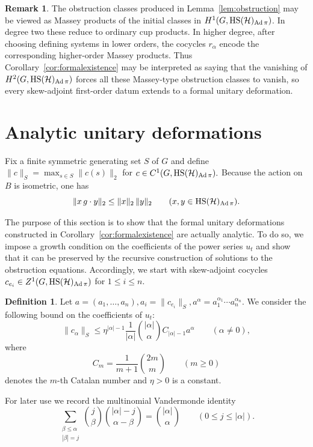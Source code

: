 \documentclass[12pt]{amsproc}
\theoremstyle{plain}
\theoremstyle{definition}
\newtheorem{definition}[theorem]{Definition}
\newtheorem{remark}[theorem]{Remark}
\numberwithin{equation}{section}
\newcommand{\HS}{{\rm HS}}
\DeclareMathOperator{\Ad}{Ad}
\begin{document}
\begin{remark}
The obstruction classes produced in Lemma~\ref{lem:obstruction} may be viewed as
Massey products of the initial classes in $H^1(G,\HS(\mathcal H)_{\Ad\pi})$.
In degree two these reduce to ordinary cup products. In higher degree,
after choosing defining systems in lower orders, the cocycles $r_\alpha$
encode the corresponding higher-order Massey products. Thus
Corollary~\ref{cor:formalexistence} may be interpreted as saying that the vanishing of
$H^2(G,\HS(\mathcal H)_{\Ad\pi})$ forces all these Massey-type obstruction classes to vanish,
so every skew-adjoint first-order datum extends to a formal unitary
deformation.
\end{remark}

\section{Analytic unitary deformations}\label{sec:analytic}
Fix a finite symmetric generating set $S$ of $G$ and define
$
\|c\|_S=\max_{s\in S}\|c(s)\|_2$ for $c\in C^1(G,\HS(\mathcal H)_{\Ad\pi}).
$
Because the action on $B$ is isometric, one has
\[
\|x\,g\cdot y\|_2\le \|x\|_2\,\|y\|_2
\qquad (x,y\in \HS(\mathcal H)_{\Ad\pi}).
\]

The purpose of this section is to show that the formal unitary deformations constructed in Corollary~\ref{cor:formalexistence} are actually analytic. To do so, we impose a growth condition on the coefficients of the power series $u_t$ and show that it can be preserved by the recursive construction of solutions to the obstruction equations. Accordingly, we start with skew-adjoint cocycles $c_{e_i}\in Z^1(G,\HS(\mathcal H)_{\Ad\pi})$ for $1\le i\le n$.

\begin{definition}
Let
$
a=(a_1,\dots,a_n),
a_i=\|c_{e_i}\|_S,
a^\alpha=a_1^{\alpha_1}\cdots a_n^{\alpha_n}.
$
We consider the following bound on the coefficients of $u_t$:
\begin{equation}\label{eq:A2} \tag{$\star_\eta$}
\|c_\alpha\|_S\le \eta^{|\alpha|-1}\frac{1}{|\alpha|}\binom{|\alpha|}{\alpha}C_{|\alpha|-1}a^\alpha
\qquad (\alpha\ne 0),
\end{equation}
where
\[
C_m=\frac{1}{m+1}\binom{2m}{m}
\qquad (m\ge 0)
\]
denotes the $m$-th Catalan number and $\eta>0$ is a constant.
\end{definition}

For later use we record the multinomial Vandermonde identity
\begin{equation}\label{eq:multivandermonde}
\sum_{\substack{\beta\le \alpha\\ |\beta|=j}}
\binom{j}{\beta}\binom{|\alpha|-j}{\alpha-\beta}
=\binom{|\alpha|}{\alpha}
\qquad (0\le j\le |\alpha|).
\end{equation}
\end{document}
